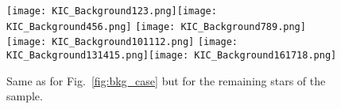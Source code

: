 \begin{figure*}
   \centering
   \texttt{[image: KIC\_Background123.png]}\texttt{[image: KIC\_Background456.png]}
   \texttt{[image: KIC\_Background789.png]}\texttt{[image: KIC\_Background101112.png]}
   \texttt{[image: KIC\_Background131415.png]}\texttt{[image: KIC\_Background161718.png]}
      \caption{Same as for Fig.~\ref{fig:bkg_case} but for the remaining stars of the sample.}
    \label{fig:bkg_tot}
\end{figure*}